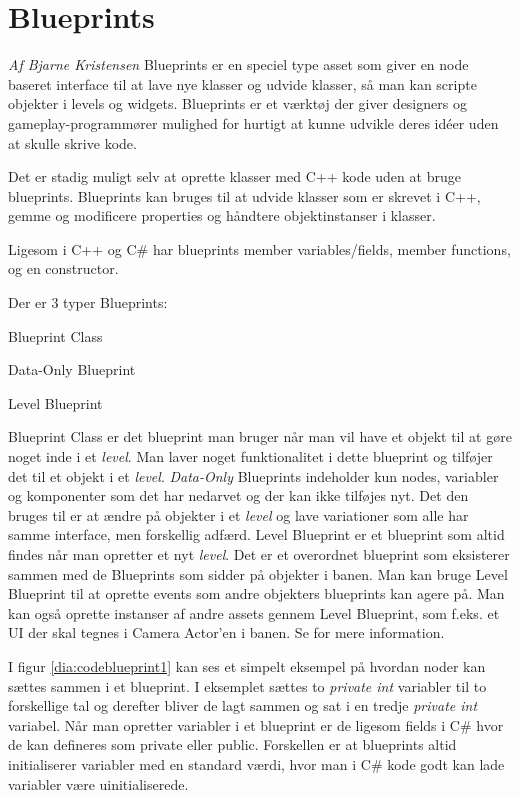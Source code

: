 \section{Blueprints}
\textit{Af Bjarne Kristensen}\newline
Blueprints er en speciel type asset som giver en node baseret interface til at lave nye klasser og udvide klasser, så man kan scripte objekter i levels og widgets. Blueprints er et værktøj der giver designers og gameplay-programmører mulighed for hurtigt at kunne udvikle deres idéer uden at skulle skrive kode.

Det er stadig muligt selv at oprette klasser med C++ kode uden at bruge blueprints. Blueprints kan bruges til at udvide klasser som er skrevet i C++, gemme og modificere properties og håndtere objektinstanser i klasser.

Ligesom i C++ og C\# har blueprints member variables/fields, member functions, og en constructor.

\begin{list}{}{}
\item[Der er 3 typer Blueprints:]
\item[Blueprint Class]
\item[Data-Only Blueprint]
\item[Level Blueprint]
\end{list}

Blueprint Class er det blueprint man bruger når man vil have et objekt til at gøre noget inde i et \textit{level}. Man laver noget funktionalitet i dette blueprint og tilføjer det til et objekt i et \textit{level}. \textit{Data-Only} Blueprints indeholder kun nodes, variabler og komponenter som det har nedarvet og der kan ikke tilføjes nyt. Det den bruges til er at ændre på objekter i et \textit{level} og lave variationer som alle har samme interface, men forskellig adfærd. Level Blueprint er et blueprint som altid findes når man opretter et nyt \textit{level}. Det er et overordnet blueprint som eksisterer sammen med de Blueprints som sidder på objekter i banen. Man kan bruge Level Blueprint til at oprette events som andre objekters blueprints kan agere på. Man kan også oprette instanser af andre assets gennem Level Blueprint, som f.eks. et UI der skal tegnes i Camera Actor'en i banen. Se \cite{blueprint} for mere information.

I figur \ref{dia:codeblueprint1} kan ses et simpelt eksempel på hvordan noder kan sættes sammen i et blueprint. I eksemplet sættes to \textit{private int} variabler til to forskellige tal og derefter bliver de lagt sammen og sat i en tredje \textit{private int} variabel. Når man opretter variabler i et blueprint er de ligesom fields i C\# hvor de kan defineres som private eller public. Forskellen er at blueprints altid initialiserer variabler med en standard værdi, hvor man i C\# kode godt kan lade variabler være uinitialiserede.

